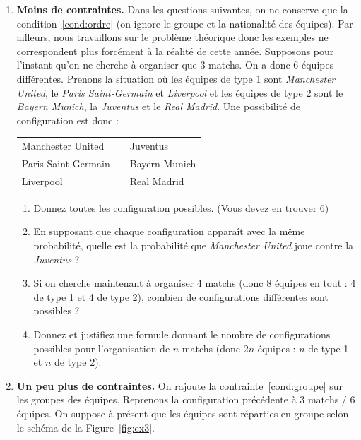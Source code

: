 \documentclass{../ficheTDTP}
\begin{document}
\begin{enumerate}
\item \textbf{Moins de contraintes.} Dans les questions suivantes, on ne conserve que la condition~\eqref{cond:ordre} (on ignore le groupe et la nationalité des équipes). Par ailleurs, nous travaillons sur le problème théorique donc les exemples ne correspondent plus forcément à la réalité de cette année. Supposons pour l'instant qu'on ne cherche à organiser que 3 matchs. On a donc 6 équipes différentes. Prenons la situation où les équipes de type 1 sont \textit{Manchester United}, le \textit{Paris Saint-Germain} et \textit{Liverpool} et les équipes de type 2 sont le \textit{Bayern Munich}, la \textit{Juventus} et le \textit{Real Madrid}. Une possibilité de configuration est donc :

\begin{tabular}{lcl}
Manchester United & & Juventus \\
Paris Saint-Germain & & Bayern Munich \\
Liverpool & & Real Madrid
\end{tabular}

\begin{enumerate}
\item Donnez toutes les configuration possibles. (Vous devez en trouver 6)

\item En supposant que chaque configuration apparaît avec la même probabilité, quelle est la probabilité que \textit{Manchester United} joue contre la \textit{Juventus} ?

\item Si on cherche maintenant à organiser 4 matchs (donc 8 équipes en tout : 4 de type 1 et 4 de type 2), combien de configurations différentes sont possibles ?

\item Donnez et justifiez une formule donnant le nombre de configurations possibles pour l'organisation de $n$ matchs (donc $2n$ équipes : $n$ de type 1 et $n$ de type 2).
\end{enumerate}

\item \textbf{Un peu plus de contraintes.} On rajoute la contrainte~\eqref{cond:groupe} sur les groupes des équipes. Reprenons la configuration précédente à 3 matchs / 6 équipes. On suppose à présent que les équipes sont réparties en groupe selon le schéma de la Figure~\ref{fig:ex3}.


\end{enumerate}
\end{document}
